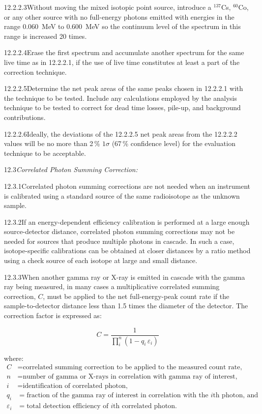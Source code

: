 \documentclass[12pt]{article}
\begin{document}
12.2.2.3\quad Without moving the mixed isotopic point source, introduce a $^{137}$Cs,
$^{60}$Co, or any other source with no full-energy photons emitted with energies in the
range 0.060~MeV to 0.600~MeV so the continuum level of the spectrum in this range is
increased 20 times.

12.2.2.4\quad Erase the first spectrum and accumulate another spectrum for the same live
time as in 12.2.2.1, if the use of live time constitutes at least a part of the
correction technique.

12.2.2.5\quad Determine the net peak areas of the same peaks chosen in 12.2.2.1 with the
technique to be tested. Include any calculations employed by the analysis technique to be
tested to correct for dead time losses, pile-up, and background contributions.

12.2.2.6\quad Ideally, the deviations of the 12.2.2.5 net peak areas from the 12.2.2.2
values will be no more than 2\,\% $1\sigma$ (67\,\% confidence level) for the evaluation
technique to be acceptable.

12.3\quad \textit{Correlated Photon Summing Correction:}

12.3.1\quad Correlated photon summing corrections are not needed when an instrument is
calibrated using a standard source of the same radioisotope as the unknown sample.

12.3.2\quad If an energy-dependent efficiency calibration is performed at a large enough
source-detector distance, correlated photon summing corrections may not be needed for
sources that produce multiple photons in cascade. In such a case, isotope-specific
calibrations can be obtained at closer distances by a ratio method using a check source
of each isotope at large and small distance.

12.3.3\quad When another gamma ray or X-ray is emitted in cascade with the gamma ray
being measured, in many cases a multiplicative correlated summing correction, $C$, must
be applied to the net full-energy-peak count rate if the sample-to-detector distance less
than 1.5 times the diameter of the detector. The correction factor is expressed as:

\begin{equation}
  C = \frac{1}{\prod_{i}^{n}(1 - q_i\,\varepsilon_i)}
  \label{eq:summing_correction}
\end{equation}

\noindent where:
\begin{align*}
  C          &= \text{correlated summing correction to be applied to the measured count rate,}\\
  n          &= \text{number of gamma or X-rays in correlation with gamma ray of interest,}\\
  i          &= \text{identification of correlated photon,}\\
  q_i        &= \text{fraction of the gamma ray of interest in correlation with the }i\text{th photon, and}\\
  \varepsilon_i &= \text{total detection efficiency of }i\text{th correlated photon.}
\end{align*}
\end{document}
